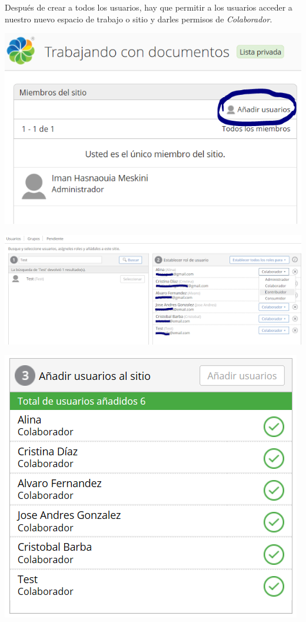\documentclass{article}
\begin{document}
Después de crear a todos los usuarios, hay que permitir a los usuarios acceder a nuestro nuevo espacio de trabajo o sitio y darles permisos de \textit{Colaborador}.

\begin{center}
\includegraphics[scale=0.5]{images/adduser.png}
\end{center}

\begin{center}
\includegraphics[scale=0.8]{images/adduser2.png}
\end{center}

\begin{center}
\includegraphics[scale=0.5]{images/adduser3.png}
\end{center} 
\end{document}
